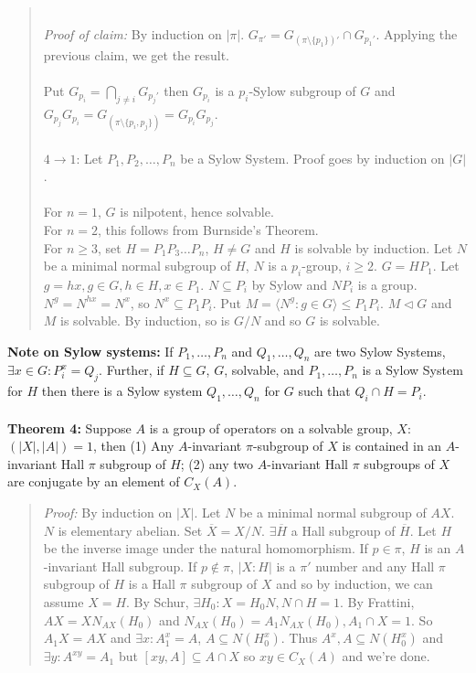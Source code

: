 \begin{quote}
\\
\emph{Proof of claim:} 
By induction on $|\pi|$.
$G_{\pi'}= G_{(\pi \setminus \{ p_1 \})'} \cap G_{p_1'}$.  Applying the previous claim, we get
the result.
\\
\\
Put $G_{p_i}= \bigcap_{j \ne i} G_{p_j'}$  then $G_{p_i}$ is a $p_i$-Sylow subgroup of $G$ and
$G_{p_j} G_{p_i}= G_{(\pi \setminus \{ p_i , p_j \})} = G_{p_i} G_{p_j}$.
\\
\\
$4 \rightarrow 1$:
Let $P_1, P_2 , \ldots , P_n$ be a Sylow System.  Proof goes by induction on $|G|$.
\\
\\
For $n=1$, $G$ is nilpotent, hence solvable.
\\
For $n=2$, this follows from Burnside's Theorem.
\\
For $n \ge 3$, set $H= P_1 P_3 \ldots P_n$, $H \ne G$ and $H$ is solvable by
induction.  Let $N$ be a minimal normal subgroup of $H$, $N$ is a $p_i$-group,
$i \ge 2$.  $G= H P_1$.  Let $g= hx, g \in G, h \in H, x \in P_1$.
$N \subseteq P_i$ by Sylow and $N P_i$ is a group.  $N^g= N^{hx}= N^x$,
so $N^x \subseteq P_1 P_i$.   Put $M= \langle N^g : g \in G \rangle \le P_1 P_i$.
$M \lhd G$ and $M$ is solvable.  By induction, so is $G/N$ and so $G$ is solvable.
\end{quote}
{\bf Note on Sylow systems:}  If 
$P_1, \ldots, P_n$ and
$Q_1, \ldots, Q_n$ are two Sylow Systems, $\exists x \in G: P_i^x= Q_j$.  Further,
if $H \subseteq G$, $G$, solvable, and
$P_1, \ldots, P_n$ is a Sylow System for $H$ then there is a Sylow system
$Q_1, \ldots, Q_n$ for $G$ such that $Q_i \cap H = P_i$.
\\
\\
{\bf Theorem 4:}
Suppose $A$ is a group of operators on a solvable group, $X$: $(|X|, |A|) = 1$, then
(1) Any $A$-invariant $\pi$-subgroup of $X$ is contained in an $A$-invariant Hall $\pi$ subgroup of $H$; 
(2) any two $A$-invariant Hall $\pi$ subgroups of $X$ are conjugate by an element
of $C_X(A)$.
\begin{quote}
\emph{Proof:}
By induction on $|X|$.
Let $N$ be a minimal normal subgroup of $AX$.  $N$ is elementary abelian.  Set
${\overline X}= X/N$.  $\exists {\overline H}$ a Hall subgroup of ${\overline H}$.
Let $H$ be the inverse image under the natural homomorphism.
If $p \in \pi$, $H$ is an $A$-invariant Hall subgroup.
If $p \notin \pi$, $|X:H|$ is a $\pi'$ number and any Hall $\pi$ subgroup of $H$
is a Hall $\pi$ subgroup of $X$ and so by induction, we can assume $X=H$.
By Schur, $\exists H_0: X= H_0N, N \cap H = 1$.  By Frattini,
$AX= X N_{AX}(H_0)$ and
$N_{AX}(H_0)= A_1 N_{AX}(H_0), A_1 \cap X = 1$.  So $A_1X= AX$ and $\exists x: A_1^x=A$,
$A \subseteq N(H_0^x)$.  Thus $A^x, A \subseteq N(H_0^x)$ and $\exists y: A^{xy}=A_1$
but $[xy, A] \subseteq A \cap X$ so $xy \in C_X(A)$ and we're done.

\end{quote}
